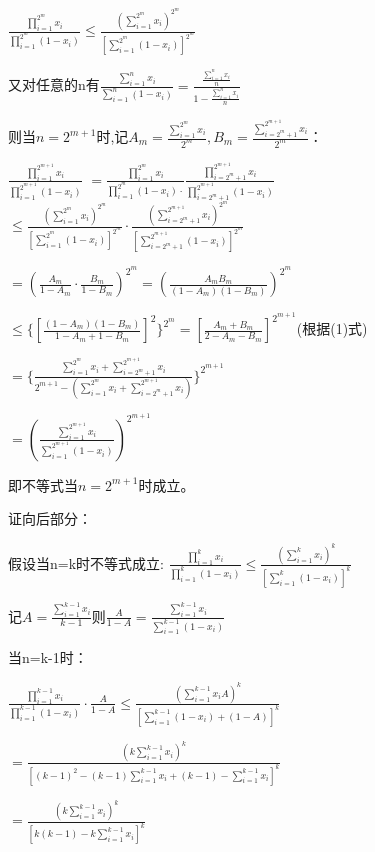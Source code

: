 \documentclass[12pt]{ctexart}
\begin{document}
$\frac{\prod\limits_{i=1}^{2^{m}}x_i}{\prod\limits_{i=1}^{2^{m}}(1-x_i)}\le\frac{(\sum\limits_{i=1}^{2^{m}}x_i)^{2^{m}}}{[\sum\limits_{i=1}^{2^{m}}(1-x_i)]^{2^{m}}}$

又对任意的n有$\frac{\sum\limits_{i=1}^{n}x_i}{\sum\limits_{i=1}^{n}(1-x_i)}=\frac{\frac{\sum\limits_{i=1}^{n}{x_i}}{n}}{1-\frac{\sum\limits_{i=1}^{n}x_i}{n}}$

则当$n=2^{m+1}$时,记$A_m=\frac{\sum\limits_{i=1}^{2^m}{x_i}}{2^m},B_m=\frac{\sum\limits_{i=2^m+1}^{2^{m+1}}{x_i}}{2^m}$：

$\frac{\prod\limits_{i=1}^{2^{m+1}}x_i}{\prod\limits_{i=1}^{2^{m+1}}(1-x_i)}$
$=\frac{\prod\limits_{i=1}^{2^{m}}x_i}{\prod\limits_{i=1}^{2^{m}}(1-x_i)\cdot}\frac{\prod\limits_{i=2^m+1}^{2^{m+1}}x_i}{\prod\limits_{i=2^m+1}^{2^{m+1}}(1-x_i)}$
$\le\frac{(\sum\limits_{i=1}^{2^{m}}x_i)^{2^{m}}}{[\sum\limits_{i=1}^{2^{m}}(1-x_i)]^{2^{m}}}\cdot\frac{(\sum\limits_{i=2^m+1}^{2^{m+1}}x_i)^{2^{m}}}{[\sum\limits_{i=2^m+1}^{2^{m+1}}(1-x_i)]^{2^{m}}}$

$=(\frac{A_m}{1-A_m}\cdot\frac{B_m}{1-B_m})^{2^m}=(\frac{A_mB_m}{(1-A_m)(1-B_m)})^{2^m}$

$\le\{[\frac{(1-A_m)(1-B_m)}{1-A_m+1-B_m}]^2\}^{2^m}=[\frac{A_m+B_m}{2-A_m-B_m}]^{2^{m+1}}$(根据(1)式)

$=\{\frac{\sum\limits_{i=1}^{2^m}x_i+\sum\limits_{i=2^m+1}^{2^{m+1}}x_i} {2^{m+1}-(\sum\limits_{i=1}^{2^m}x_i+\sum\limits_{i=2^m+1}^{2^{m+1}}x_i)}\}^{2^{m+1}}$

$=(\frac{\sum\limits_{i=1}^{2^{m+1}}x_i}{\sum\limits_{i=1}^{2^{m+1}}(1-x_i)})^{2^{m+1}}$

即不等式当$n=2^{m+1}$时成立。

证向后部分：

假设当n=k时不等式成立:
$\frac{\prod\limits_{i=1}^{k}x_i}{\prod\limits_{i=1}^{k}(1-x_i)}\le\frac{(\sum\limits_{i=1}^{k}x_i)^k}{[\sum\limits_{i=1}^{k}(1-x_i)]^k}$

记$A=\frac{\sum\limits_{i=1}^{k-1}{x_i}}{k-1}$则$\frac{A}{1-A}=\frac{\sum\limits_{i=1}^{k-1}{x_i}}{\sum\limits_{i=1}^{k-1}{(1-x_i)}}$

当n=k-1时：

$\frac{\prod\limits_{i=1}^{k-1}{x_i}}{\prod\limits_{i=1}^{k-1}(1-x_i)}\cdot\frac{A}{1-A}\le\frac{(\sum\limits_{i=1}^{k-1}{x_i}A)^k}{[\sum\limits_{i=1}^{k-1}{(1-x_i)}+(1-A)]^k}$

$=\frac{(k\sum\limits_{i=1}^{k-1}x_i)^k}{[{(k-1)}^2-(k-1)\sum\limits_{i=1}^{k-1}{x_i}+(k-1)-\sum\limits_{i=1}^{k-1}{x_i}]^k}$

$=\frac{(k\sum\limits_{i=1}^{k-1}x_i)^k}{[{k(k-1)}-k\sum\limits_{i=1}^{k-1}{x_i}]^k}$
\end{document}
